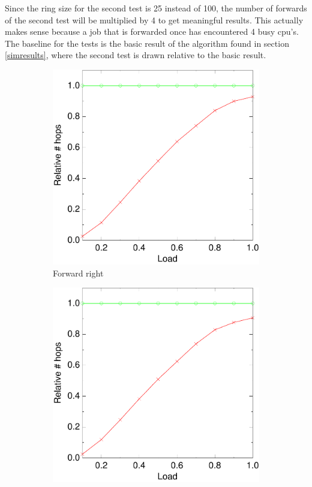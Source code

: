 \documentclass[10pt,a4paper]{article}
\begin{document}
Since the ring size for the second test is 25 instead of 100, the number of forwards of the second test will be multiplied by 4 to get meaningful results. This actually makes sense because a job that is forwarded once has encountered 4 busy cpu's. The baseline for the tests is the basic result of the algorithm found in section \ref{simresults}, where the second test is drawn relative to the basic result.

\begin{figure}
        \begin{subfigure}[b]{0.5\textwidth}
                \centering
                \includegraphics[width=\textwidth]{data/4rightright.pdf}
                \caption{Forward right}
        \end{subfigure}
        \begin{subfigure}[b]{0.5\textwidth}
                \centering
                \includegraphics[width=\textwidth]{data/4switchswitch.pdf}

\end{subfigure}
\end{figure}
\end{document}
